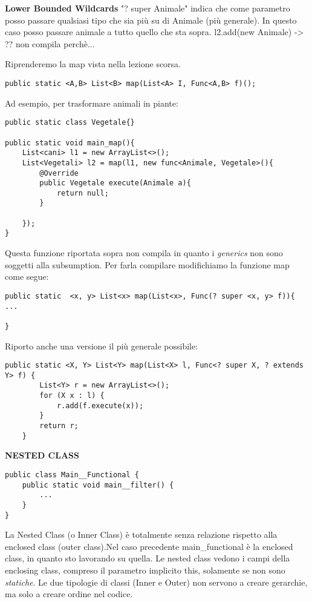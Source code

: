 \noindent \textbf{Lower Bounded Wildcards} \newline
"? super Animale" indica che come parametro posso passare qualsiasi tipo che sia più su di Animale (più generale).\newline
In questo caso posso passare animale a tutto quello che sta sopra. \newline
l2.add(new Animale) -> ?? non compila perchè... \newline

\noindent Riprenderemo la map vista nella lezione scorsa.
\begin{lstlisting}[basicstyle=\small,]
public static <A,B> List<B> map(List<A> I, Func<A,B> f)();
\end{lstlisting}
Ad esempio, per trasformare animali in piante: 

\begin{lstlisting}[basicstyle=\small,]
public static class Vegetale{}

public static void main_map(){
	List<cani> l1 = new ArrayList<>();
	List<Vegetali> l2 = map(l1, new func<Animale, Vegetale>(){
		@Override
		public Vegetale execute(Animale a){
			return null;
		}
	
	});
}
\end{lstlisting}

\noindent Questa funzione riportata sopra non compila in quanto i \textit{generics} non sono soggetti alla subsumption. Per farla compilare modifichiamo la funzione map come segue: 

\begin{lstlisting}[basicstyle=\small,]
public static  <x, y> List<x> map(List<x>, Func(? super <x, y> f)){
...

}
\end{lstlisting}

\noindent Riporto anche una versione il più generale possibile: \newline

\begin{lstlisting}[basicstyle=\small,]
    public static <X, Y> List<Y> map(List<X> l, Func<? super X, ? extends Y> f) {
        List<Y> r = new ArrayList<>();
        for (X x : l) {
            r.add(f.execute(x));
        }
        return r;
    } 
\end{lstlisting}

\noindent \textbf{NESTED CLASS}\newline
\begin{lstlisting}[basicstyle=\small,]
public class Main__Functional {
	public static void main__filter() {
		...
	}
}
\end{lstlisting}
La Nested Class (o Inner Class) è totalmente senza relazione rispetto alla enclosed class (outer class).Nel caso precedente main{\_}functional è la enclosed class, in quanto sto lavorando su quella. \newline
Le nested class vedono i campi della enclosing class, compreso il parametro implicito this, solamente se non sono \textit{statiche}.\newline
Le due tipologie di classi (Inner e Outer) non servono a creare gerarchie, ma solo a creare ordine nel codice.

